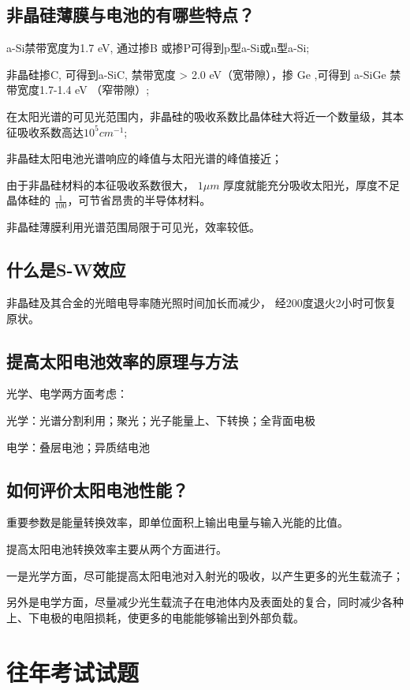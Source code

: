 \documentclass{article}
\begin{document}
\subsection{非晶硅薄膜与电池的有哪些特点？}

  a-Si禁带宽度为1.7 eV, 通过掺B 或掺P可得到p型a-Si或n型a-Si;

非晶硅掺C, 可得到a-SiC, 禁带宽度 > 2.0 eV（宽带隙），掺 Ge ,可得到 a-SiGe 禁带宽度1.7-1.4 eV （窄带隙）;

    在太阳光谱的可见光范围内，非晶硅的吸收系数比晶体硅大将近一个数量级，其本征吸收系数高达$10^5 cm^{-1}$;

    非晶硅太阳电池光谱响应的峰值与太阳光谱的峰值接近；

由于非晶硅材料的本征吸收系数很大， $1 \mu m$ 厚度就能充分吸收太阳光，厚度不足晶体硅的 $\frac{1}{100}$，可节省昂贵的半导体材料。

非晶硅薄膜利用光谱范围局限于可见光，效率较低。

\subsection{什么是S-W效应}

非晶硅及其合金的光暗电导率随光照时间加长而减少， 经200度退火2小时可恢复原状。

\subsection{提高太阳电池效率的原理与方法}

光学、电学两方面考虑：

光学：光谱分割利用；聚光；光子能量上、下转换；全背面电极

电学：叠层电池；异质结电池

\subsection{如何评价太阳电池性能？}


重要参数是能量转换效率，即单位面积上输出电量与输入光能的比值。

提高太阳电池转换效率主要从两个方面进行。

一是光学方面，尽可能提高太阳电池对入射光的吸收，以产生更多的光生载流子；

另外是电学方面，尽量减少光生载流子在电池体内及表面处的复合，同时减少各种上、下电极的电阻损耗，使更多的电能能够输出到外部负载。

\newpage

\section{往年考试试题}
\end{document}
